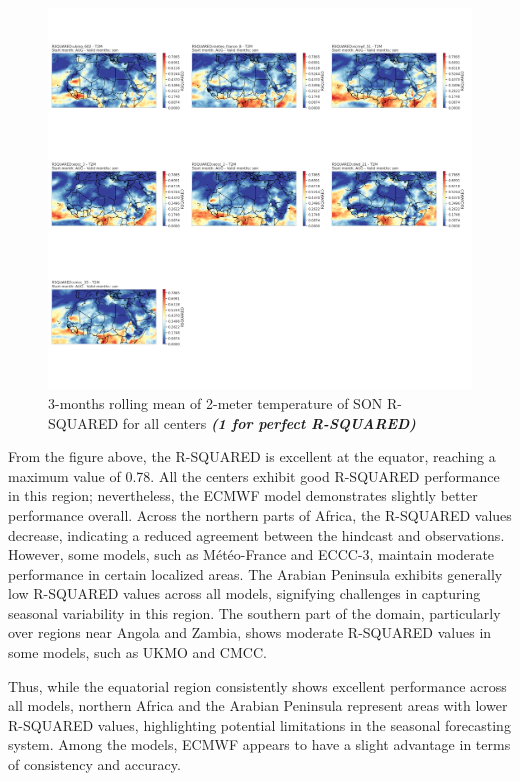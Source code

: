 \begin{figure}[H]
    \centering
    \includegraphics[width=1\linewidth]{plots/det/rsquared/rsquared_son_t2m.png}
    \caption{3-months rolling mean of 2-meter temperature of SON R-SQUARED  for all centers \textbf{\textit{(1 for perfect R-SQUARED)} }}
\end{figure}

From the figure above, the R-SQUARED is excellent at the equator, reaching a maximum value of 0.78. All the centers exhibit good R-SQUARED performance in this region; nevertheless, the ECMWF model demonstrates slightly better performance overall. Across the northern parts of Africa, the R-SQUARED values decrease, indicating a reduced agreement between the hindcast and observations. However, some models, such as Météo-France and ECCC-3, maintain moderate performance in certain localized areas. The Arabian Peninsula exhibits generally low R-SQUARED values across all models, signifying challenges in capturing seasonal variability in this region. The southern part of the domain, particularly over regions near Angola and Zambia, shows moderate R-SQUARED values in some models, such as UKMO and CMCC.

Thus, while the equatorial region consistently shows excellent performance across all models, northern Africa and the Arabian Peninsula represent areas with lower R-SQUARED values, highlighting potential limitations in the seasonal forecasting system. Among the models, ECMWF appears to have a slight advantage in terms of consistency and accuracy.

